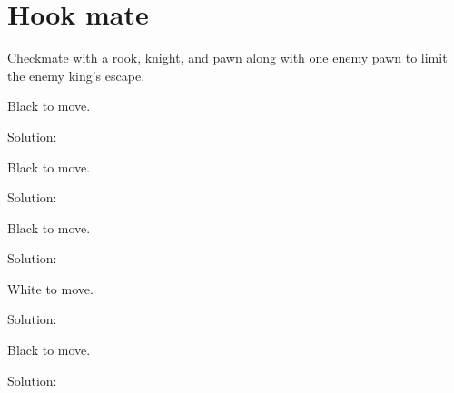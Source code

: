 \documentclass{book}
\begin{document}
\section{Hook mate}
Checkmate with a rook, knight, and pawn along with one enemy pawn to limit the enemy king's escape.\begin{multicols}{2} 
\begin{samepage} 
\newgame 


 
\showboard
 
 Black to move. 
 
Solution: 
 
\end{samepage}\begin{samepage} 
\newgame 


 
\showboard
 
 Black to move. 
 
Solution: 
 
\end{samepage}\begin{samepage} 
\newgame 


 
\showboard
 
 Black to move. 
 
Solution: 
 
\end{samepage}\begin{samepage} 
\newgame 


 
\showboard
 
 White to move. 
 
Solution: 
 
\end{samepage}\begin{samepage} 
\newgame 


 
\showboard
 
 Black to move. 
 
Solution: 
 
\end{samepage}\end{multicols} 
\newpage 
\end{document}
